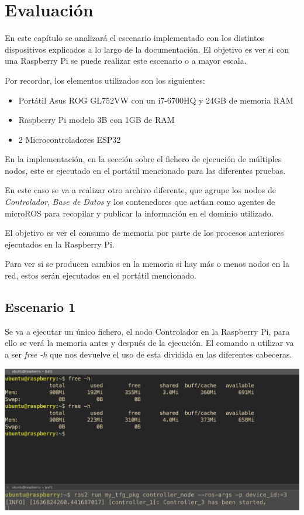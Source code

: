 \chapter{Evaluación}

En este capítulo se analizará el escenario implementado con los distintos dispositivos explicados a lo largo de la documentación. El objetivo es ver si con una Raspberry Pi se puede realizar este escenario o a mayor escala.

Por recordar, los elementos utilizados son los siguientes:

\begin{itemize}
    \item Portátil Asus ROG GL752VW con un i7-6700HQ y 24GB de memoria RAM
    \item Raspberry Pi modelo 3B con 1GB de RAM
    \item 2 Microcontroladores ESP32
\end{itemize}

En la implementación, en la sección sobre el fichero de ejecución de múltiples nodos, este es ejecutado en el portátil mencionado para las diferentes pruebas. 

En este caso se va a realizar otro archivo diferente, que agrupe los nodos de \textit{Controlador}, \textit{Base de Datos} y los contenedores que actúan como agentes de microROS para recopilar y publicar la información en el dominio utilizado.

El objetivo es ver el consumo de memoria por parte de los procesos anteriores ejecutados en la Raspberry Pi.

Para ver si se producen cambios en la memoria si hay más o menos nodos en la red, estos serán ejecutados en el portátil mencionado.

\section{Escenario 1}

Se va a ejecutar un único fichero, el nodo Controlador en la Raspberry Pi, para ello se verá la memoria antes y después de la ejecución. El comando a utilizar va a ser \textit{free -h} que nos devuelve el uso de esta dividida en las diferentes cabeceras.

\begin{center}
    \centering
    \includegraphics[width=\textwidth]{img/09-Escenario1.png}
    \label{fig:escenario-1}
\end{center}

